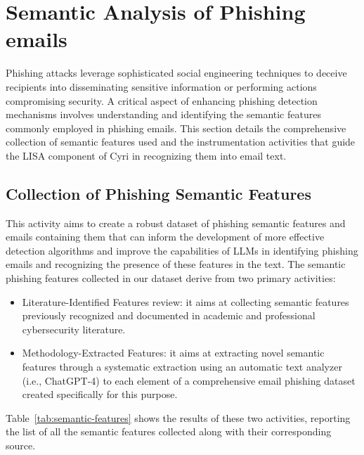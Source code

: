 \section{Semantic Analysis of Phishing emails}
\label{sec:semantic}

Phishing attacks leverage sophisticated social engineering techniques to deceive recipients into disseminating sensitive information or performing actions compromising security. A critical aspect of enhancing phishing detection mechanisms involves
understanding and identifying the semantic features commonly employed in phishing emails. This section details the comprehensive collection of semantic features used and the instrumentation activities that guide the LISA component of Cyri in recognizing them into email text.

\subsection{Collection of Phishing Semantic Features}

This activity aims to create a robust dataset of phishing semantic features and emails containing them
that can inform the development of more effective detection algorithms and improve the capabilities of LLMs in identifying phishing
emails and recognizing the presence of these features in the text. The semantic phishing features collected in our dataset derive from two primary activities:

\begin{itemize}
    \item Literature-Identified Features review: it aims at collecting semantic features previously recognized and documented in academic and professional cybersecurity literature.
    \item Methodology-Extracted Features: it aims at extracting novel semantic features through a systematic extraction using an automatic text analyzer (i.e., ChatGPT-4) to each element of a comprehensive email phishing dataset created specifically for this purpose.
\end{itemize}

Table~\ref{tab:semantic-features} shows the results of these two activities, reporting the list of all the semantic features collected along with their corresponding source.

